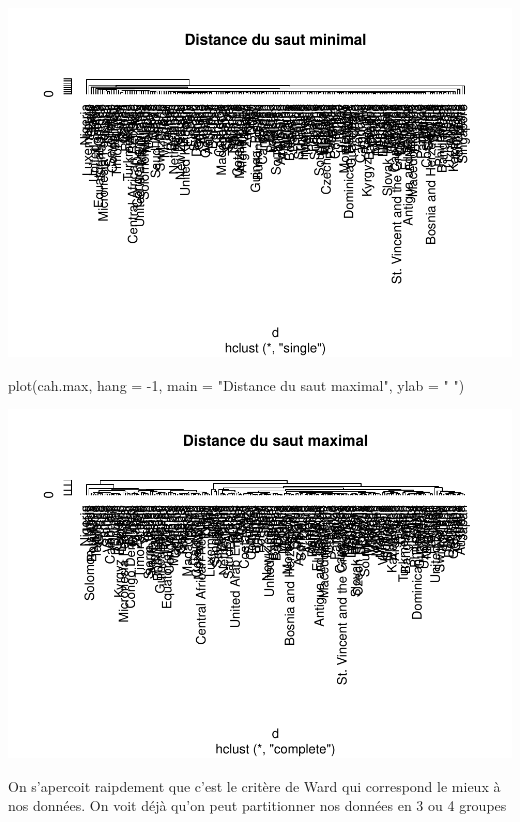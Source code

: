 \documentclass[
]{article}
\newenvironment{Shaded}{}{}
\newcommand{\AttributeTok}[1]{#1}
\newcommand{\DecValTok}[1]{#1}
\newcommand{\FunctionTok}[1]{#1}
\newcommand{\NormalTok}[1]{#1}
\newcommand{\SpecialCharTok}[1]{\textcolor[rgb]{0.00,0.50,0.50}{#1}}
\newcommand{\StringTok}[1]{\textcolor[rgb]{0.00,0.50,0.50}{#1}}
\begin{document}
\includegraphics{Projet_files/figure-latex/unnamed-chunk-13-1.pdf}

\begin{Shaded}
\begin{Highlighting}[]
\FunctionTok{plot}\NormalTok{(cah.max, }\AttributeTok{hang =} \SpecialCharTok{{-}}\DecValTok{1}\NormalTok{, }\AttributeTok{main =} \StringTok{"Distance du saut maximal"}\NormalTok{, }\AttributeTok{ylab =} \StringTok{" "}\NormalTok{)}
\end{Highlighting}
\end{Shaded}

\includegraphics{Projet_files/figure-latex/unnamed-chunk-14-1.pdf}

On s'apercoit raipdement que c'est le critère de Ward qui correspond le
mieux à nos données. On voit déjà qu'on peut partitionner nos données en
3 ou 4 groupes
\end{document}
